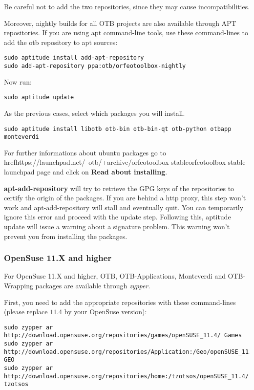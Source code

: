 Be careful not to add the two repositories, since they may cause incompatibilities.

Moreover, nightly builds for all OTB projects are also available through APT repositories.
If you are using apt command-line tools, use these command-lines to add the otb repository to apt sources:
\begin{verbatim}
sudo aptitude install add-apt-repository 
sudo add-apt-repository ppa:otb/orfeotoolbox-nightly
\end{verbatim}
Now run:
\begin{verbatim}
sudo aptitude update
\end{verbatim}
As the previous cases, select which packages you will install.
\begin{verbatim}
sudo aptitude install libotb otb-bin otb-bin-qt otb-python otbapp monteverdi
\end{verbatim}

For further informations about ubuntu packages go to href{https://launchpad.net/~otb/+archive/orfeotoolbox-stable}{orfeotoolbox-stable} launchpad page and click on \textbf{Read about installing}.

\textbf{apt-add-repository} will try to retrieve the GPG keys of the repositories to certify the origin of the packages. If you are behind a http proxy, this step won't work and apt-add-repository will stall and eventually quit. You can temporarily ignore this error and proceed with the update step. Following this, aptitude update will issue a warning about a signature problem. This warning won't prevent you from installing the packages.

\subsubsection{OpenSuse 11.X and higher}
\label{ssec:opensuse_binaries}

For OpenSuse 11.X and higher, OTB, OTB-Applications, Monteverdi and 
OTB-Wrapping packages are available through \emph{zypper}.

First, you need to add the appropriate repositories with these command-lines (please replace $11.4$ by your OpenSuse version):
\begin{verbatim}
sudo zypper ar 
http://download.opensuse.org/repositories/games/openSUSE_11.4/ Games
sudo zypper ar 
http://download.opensuse.org/repositories/Application:/Geo/openSUSE_11.4/ GEO
sudo zypper ar 
http://download.opensuse.org/repositories/home:/tzotsos/openSUSE_11.4/ tzotsos
\end{verbatim}

